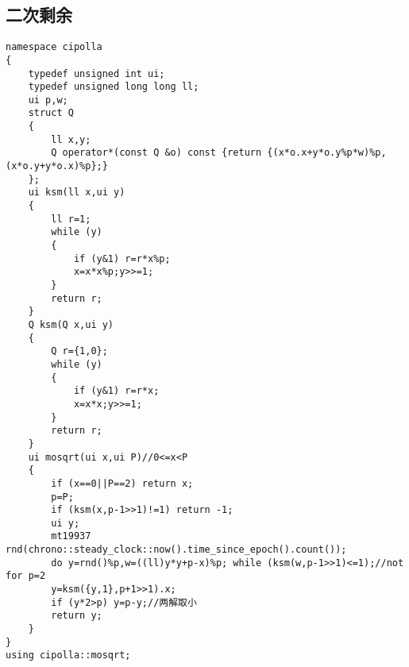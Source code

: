 \documentclass[12pt]{ctexart}
\begin{document}
\subsection{二次剩余}

\begin{lstlisting}
namespace cipolla
{
	typedef unsigned int ui;
	typedef unsigned long long ll;
	ui p,w;
	struct Q
	{
		ll x,y;
		Q operator*(const Q &o) const {return {(x*o.x+y*o.y%p*w)%p,(x*o.y+y*o.x)%p};}
	};
	ui ksm(ll x,ui y)
	{
		ll r=1;
		while (y)
		{
			if (y&1) r=r*x%p;
			x=x*x%p;y>>=1;
		}
		return r;
	}
	Q ksm(Q x,ui y)
	{
		Q r={1,0};
		while (y)
		{
			if (y&1) r=r*x;
			x=x*x;y>>=1;
		}
		return r;
	}
	ui mosqrt(ui x,ui P)//0<=x<P
	{
		if (x==0||P==2) return x;
		p=P;
		if (ksm(x,p-1>>1)!=1) return -1;
		ui y;
		mt19937 rnd(chrono::steady_clock::now().time_since_epoch().count());
		do y=rnd()%p,w=((ll)y*y+p-x)%p; while (ksm(w,p-1>>1)<=1);//not for p=2
		y=ksm({y,1},p+1>>1).x;
		if (y*2>p) y=p-y;//两解取小
		return y;
	}
}
using cipolla::mosqrt;
\end{lstlisting}
\end{document}
